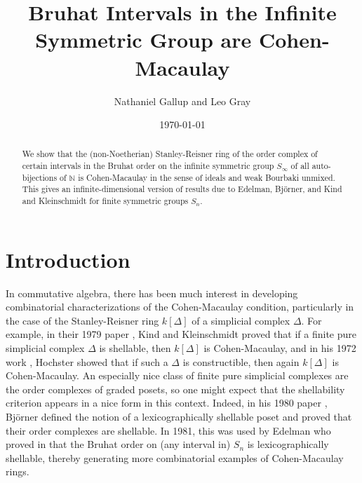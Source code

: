 \documentclass[oneside,11pt,reqno]{amsart}
\theoremstyle{definition}
\newtheorem{proof techniques}{Proof Techniques}
\begin{document}
\title{Bruhat Intervals in the Infinite Symmetric Group are Cohen-Macaulay}
\author{Nathaniel Gallup and Leo Gray} 
\date{\today}


\begin{abstract}
    We show that the (non-Noetherian) Stanley-Reisner ring of the order complex of certain intervals in the Bruhat order on the infinite symmetric group $S_\infty$ of all auto-bijections of $\mathbb{N}$ is Cohen-Macaulay in the sense of ideals and weak Bourbaki unmixed. This gives an infinite-dimensional version of results due to Edelman, Bj\"{o}rner, and Kind and Kleinschmidt for finite symmetric groups $S_n$. 
\end{abstract}

\maketitle


\section{Introduction}

In commutative algebra, there has been much interest in developing combinatorial characterizations of the Cohen-Macaulay condition, particularly in the case of the Stanley-Reisner ring $k[\Delta]$ of a simplicial complex $\Delta$. For example, in their 1979 paper \cite{kind_schalbare_1979}, Kind and Kleinschmidt proved that if a finite pure simplicial complex $\Delta$ is shellable, then $k[\Delta]$ is Cohen-Macaulay, and in his 1972 work \cite{hochster1972}, Hochster showed that if such a $\Delta$ is constructible, then again $k[\Delta]$ is Cohen-Macaulay. An especially nice class of finite pure simplicial complexes are the order complexes of graded posets, so one might expect that the shellability criterion appears in a nice form in this context. Indeed, in his 1980 paper \cite{bjorner1980shellable}, Björner defined the notion of a lexicographically shellable poset and proved that their order complexes are shellable. In 1981, this was used by Edelman who proved in \cite{edelman1981bruhat} that the Bruhat order on (any interval in) $S_n$ is lexicographically shellable, thereby generating more combinatorial examples of Cohen-Macaulay rings.
\end{document}
